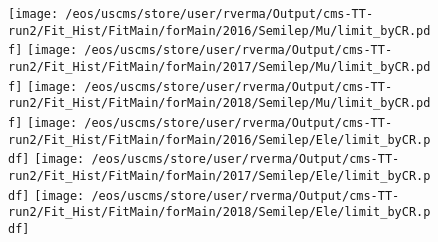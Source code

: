 \begin{figure}
\centering
\texttt{[image: /eos/uscms/store/user/rverma/Output/cms-TT-run2/Fit\_Hist/FitMain/forMain/2016/Semilep/Mu/limit\_byCR.pdf]}
\texttt{[image: /eos/uscms/store/user/rverma/Output/cms-TT-run2/Fit\_Hist/FitMain/forMain/2017/Semilep/Mu/limit\_byCR.pdf]}
\texttt{[image: /eos/uscms/store/user/rverma/Output/cms-TT-run2/Fit\_Hist/FitMain/forMain/2018/Semilep/Mu/limit\_byCR.pdf]}
\texttt{[image: /eos/uscms/store/user/rverma/Output/cms-TT-run2/Fit\_Hist/FitMain/forMain/2016/Semilep/Ele/limit\_byCR.pdf]}
\texttt{[image: /eos/uscms/store/user/rverma/Output/cms-TT-run2/Fit\_Hist/FitMain/forMain/2017/Semilep/Ele/limit\_byCR.pdf]}
\texttt{[image: /eos/uscms/store/user/rverma/Output/cms-TT-run2/Fit\_Hist/FitMain/forMain/2018/Semilep/Ele/limit\_byCR.pdf]}
\end{figure}
